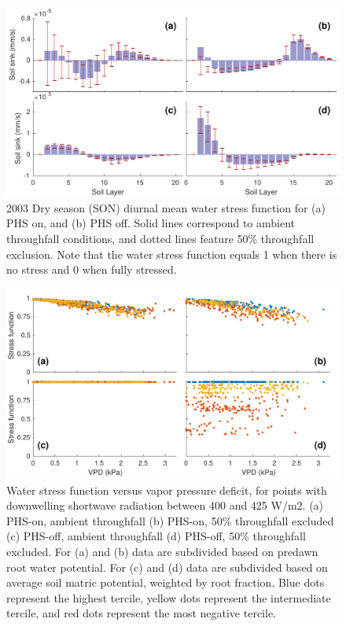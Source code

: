 \documentclass[draft,linenumbers]{agujournal}
\begin{document}
          \clearpage
    \begin{figure}[h]
     \centering
     \includegraphics[width=30pc]{../figs/fig10.pdf}
     \caption{2003 Dry season (SON) diurnal mean water stress function for 
     (a) PHS on, and
     (b) PHS off.
     Solid lines correspond to ambient throughfall conditions, and dotted lines feature 50\% throughfall exclusion.
     Note that the water stress function equals 1 when there is no stress and 0 when fully stressed.
     }
     \label{fig4}
  \end{figure}
  
      \clearpage
    \begin{figure}[h]
     \centering
     \includegraphics[width=30pc]{../figs/fig5.pdf}
     \caption{Water stress function versus vapor pressure deficit, for points with downwelling shortwave radiation between 400 and 425 W/m2.
     (a) PHS-on, ambient throughfall
     (b) PHS-on, 50\% throughfall excluded
     (c) PHS-off, ambient throughfall
     (d) PHS-off, 50\% throughfall excluded. 
     For (a) and (b) data are subdivided based on predawn root water potential.
     For (c) and (d) data are subdivided based on average soil matric potential, weighted by root fraction.
     Blue dots represent the highest tercile, yellow dots represent the intermediate tercile, and red dots represent the most negative tercile.
     }
     \label{fig5}
       \end{figure}
  
\end{document}
